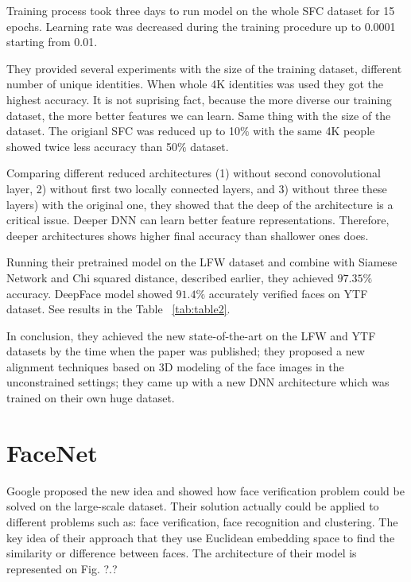 \documentclass[paper=a4, fontsize=11pt]{scrartcl} %
\numberwithin{equation}{section} %
\numberwithin{figure}{section} %
\numberwithin{table}{section} %
\begin{document}
Training process took three days to run model on the whole SFC dataset for 15 epochs. Learning rate was decreased during the training procedure up to 0.0001 starting from 0.01. \par

They provided several experiments with the size of the training dataset, different number of unique identities. When whole 4K identities was used they got the highest accuracy. It is not suprising fact, because the more diverse our training dataset, the more better features we can learn. Same thing with the size of the dataset. The origianl SFC was reduced up to 10$\%$ with the same 4K people showed twice less accuracy than 50$\%$ dataset.\par

Comparing different reduced architectures (1) without second conovolutional layer, 2) without first two locally connected layers, and 3) without three these layers) with the original one, they showed that the deep of the architecture is a critical issue. Deeper DNN can learn better feature representations. Therefore, deeper architectures shows higher final accuracy than shallower ones does. \par

Running their pretrained model on the LFW dataset and combine with Siamese Network and Chi squared distance, described earlier, they achieved $97.35\%$ accuracy. DeepFace model showed $91.4\%$ accurately verified faces on YTF dataset. See results in the Table ~\ref{tab:table2}.

In conclusion, they achieved the new state-of-the-art on the LFW and YTF datasets by the time when the paper was published; they proposed a new alignment techniques based on 3D modeling of the face images in the unconstrained settings; they came up with a new DNN architecture which was trained on their own huge dataset.

\section{FaceNet}

Google proposed the new idea \cite{schroff2015facenet} and showed how face verification problem could be solved on the large-scale dataset. Their solution actually could be applied to different problems such as: face verification, face recognition and clustering. The key idea of their approach that they use Euclidean embedding space to find the similarity or difference between faces. The architecture of their model is represented on Fig. ?.?
\end{document}
